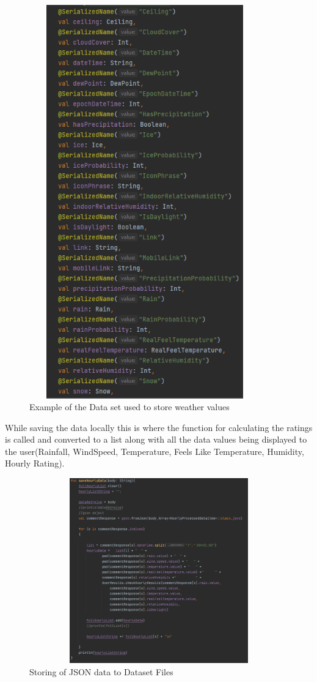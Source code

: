 \begin{figure}[H]
    \centering
    \includegraphics[width=10cm,height = 17cm]{img/DataExample.PNG}
    \caption{Example of the Data set used to store weather values}
    \label{fig:Example of the Data set used to store weather values}
\end{figure}

While saving the data locally this is where the function for calculating the ratings is called and converted to a list along with all the data values being displayed to the user(Rainfall, WindSpeed, Temperature, Feels Like Temperature, Humidity, Hourly Rating).

\begin{figure}[H]
    \centering
    \includegraphics[width=12cm,height = 8cm]{img/DataStore.PNG}
    \caption{Storing of JSON data to Dataset Files}
    \label{fig:Storing of JSON data to Dataset Files}
\end{figure}

